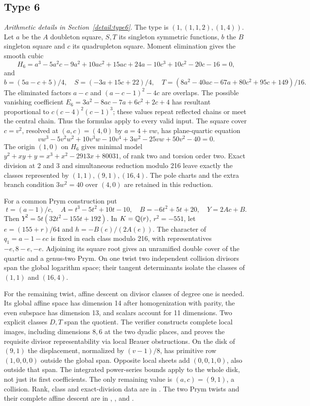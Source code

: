 \subsection{Type 6}\label{app:type6}
\noindent\emph{Arithmetic details in Section~\ref{detail:type6}.}\enspace
The type is $(1,(1,1,2),(1,4))$. Let $a$ be the $A$ doubleton square,
$S,T$ its singleton symmetric functions, $b$ the $B$ singleton square
and $c$ its quadrupleton square. Moment elimination gives the smooth cubic
\[
 H_6=a^3-5a^2c-9a^2+10ac^2+15ac+24a-10c^3+10c^2-20c-16=0,
\]
and
\[
 b=(5a-c+5)/4,\quad S=(-3a+15c+22)/4,
 \quad T=(8a^2-40ac-67a+80c^2+95c+149)/16.
\]
The eliminated factors $a-c$ and $(a-c-1)^2-4c$ are overlaps.
The possible vanishing coefficient
$E_6=3a^2-8ac-7a+6c^2+2c+4$ has resultant proportional to
$c(c-4)^2(c-1)^3$; these values repeat reflected chains or meet the
central chain. Thus the formulas apply to every valid input.
The square cover $c=v^2$, resolved at $(a,c)=(4,0)$ by $a=4+vw$,
has plane-quartic equation
\[
 vw^3-5v^2w^2+10v^3w-10v^4+3w^2-25vw+50v^2-40=0.
\]
The origin $(1,0)$ on $H_6$ gives minimal model
$y^2+xy+y=x^3+x^2-2913x+80031$, of rank two and torsion order two.
Exact division at 2 and 3 and simultaneous reduction modulo 216 leave
exactly the classes represented by $(1,1),(9,1),(16,4)$.
The pole charts and the extra branch condition $3w^2=40$ over $(4,0)$
are retained in this reduction.

For a common Prym construction put
\[
 t=(a-1)/c,\quad A=t^3-5t^2+10t-10,\quad B=-6t^2+5t+20,
 \quad Y=2Ac+B.
\]
Then $Y^2=5t(32t^2-155t+192)$. In $K=\mathbb Q(r)$,
$r^2=-551$, let $e=(155+r)/64$ and $h=-B(e)/(2A(e))$.
The character of $q_1=a-1-ec$ is fixed in each class modulo 216,
with representatives $-e,8-e,-e$. Adjoining its square root gives
an unramified double cover of the quartic and a genus-two Prym.
On one twist two independent collision divisors span the global
logarithm space; their tangent determinants isolate the classes of
$(1,1)$ and $(16,4)$.

For the remaining twist, affine descent on divisor classes of degree one
is needed. Its global affine space has dimension 14 after homogenization
with parity, the even subspace has dimension 13, and scalars account
for 11 dimensions. Two explicit classes $D,T$ span the quotient.
The verifier constructs complete local images, including dimensions
$8,6$ at the two dyadic places, and proves the requisite divisor
representability via local Brauer obstructions. On the disk of
$(9,1)$ the displacement, normalized by $(v-1)/8$, has primitive
row $(1,0,0,0)$ outside the global span. Opposite local sheets add
$(0,0,1,0)$, also outside that span. The integrated power-series
bounds apply to the whole disk, not just its first coefficients.
The only remaining value is $(a,c)=(9,1)$, a collision.
Rank, class and exact-division data are in .
The two Prym twists and their complete affine descent are in
, ,
 and .

